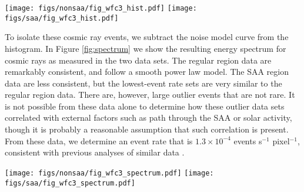 \documentclass{ws-jai}
\begin{document}
\begin{figure*}[ht!]
\centering
\texttt{[image: figs/nonsaa/fig\_wfc3\_hist.pdf]}
\texttt{[image: figs/saa/fig\_wfc3\_hist.pdf]}
\caption{Histograms of the pixel values for two files typical of the
  SAA and regular regions. The two data sets have been scaled to the
  common SAA integration time of $150 \,$s.  This has the effect of
  causing the white-noise component width to be the same between the
  two sets, but increases the relative contribution of rare events in
  the non-SAA data.  Also shown are a Gaussian model for the quasi-white
  noise contribution (solid red line) with an rms noise of
  $\sim 24 \,$e$^{-1}$ (corresponding to $\sim 150 \,$me$^{-}$/s).  To
  account for the non-Gaussian population of pixels creating the
  negative-going wing, we fit a power law model (yellow line), and
  also show the sum of the noise components (blue line).  Assuming
  that the non-Gaussian noise component is equal in both the negative-
  and positive-going directions, the excess of the histogram on the
  positive-going side over the power law term is due to cosmic ray
  events. \label{fig:histograms} }
\end{figure*}

To isolate these cosmic ray events, we subtract the noise model curve
from the histogram.  In Figure \ref{fig:spectrum} we show the
resulting energy spectrum for cosmic rays as measured in the two data
sets.  The regular region data are remarkably consistent, and follow a
smooth power law model.  The SAA region data are less consistent, but
the lowest-event rate sets are very similar to the regular region
data.  There are, however, large outlier events that are not rare.  It
is not possible from these data alone to determine how these outlier
data sets correlated with external factors such as path through the
SAA or solar activity, though it is probably a reasonable assumption
that such correlation is present.  From these data, we determine an
event rate that is $1.3 \times 10^{-4}$ events s$^{-1}$ pixel$^{-1}$,
consistent with previous analyses of similar data \citep{Barker2010}.

\begin{figure*}[ht!]
\centering
\texttt{[image: figs/nonsaa/fig\_wfc3\_spectrum.pdf]}
\texttt{[image: figs/saa/fig\_wfc3\_spectrum.pdf]}
\caption{Cosmic ray energy spectra for both regular and 
  (left panel) and SAA regions (right panel).  Colors correspond to
  data set number.  \label{fig:spectrum} }
\end{figure*}
\end{document}
